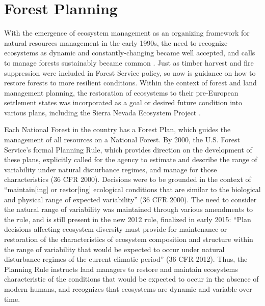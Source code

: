 
\section{Forest Planning}

With the emergence of ecosystem management as an organizing framework for natural resources management in the early 1990s, the need to recognize ecosystems as dynamic and constantly-changing became well accepted, and calls to manage forests sustainably became common \citep{Christensen1996}. Just as timber harvest and fire suppression were included in Forest Service policy, so now is guidance on how to restore forests to more resilient conditions. Within the context of forest and land management planning, the restoration of ecosystems to their pre-European settlement states was incorporated as a goal or desired future condition into various plans, including the Sierra Nevada Ecosystem Project \citep{SNEP1996a}. 

Each National Forest in the country has a Forest Plan, which guides the management of all resources on a National Forest. By 2000, the U.S. Forest Service's formal Planning Rule, which provides direction on the development of these plans, explicitly called for the agency to estimate and describe the range of variability under natural disturbance regimes, and manage for those characteristics (36 CFR  2000). Decisions were to be grounded in the context of ``maintain[ing] or restor[ing] ecological conditions that are similar to the biological and physical range of expected variability'' (36 CFR  2000). The need to consider the natural range of variability was maintained through various amendments to the rule, and is still present in the new 2012 rule, finalized in early 2015: ``Plan decisions affecting ecosystem diversity must provide for maintenance or restoration of the characteristics of ecosystem composition and structure within the range of variability that would be expected to occur under natural disturbance regimes of the current climatic period'' (36 CFR  2012). Thus, the Planning Rule instructs land managers to restore and maintain ecosystems characteristic of the conditions that would be expected to occur in the absence of modern humans, and recognizes that ecosystems are dynamic and variable over time.





